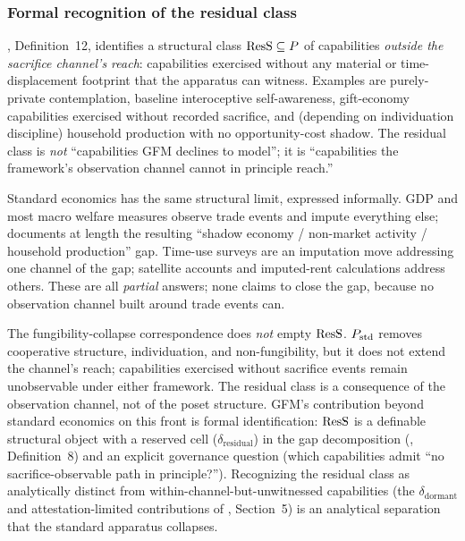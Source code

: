 \subsubsection{Formal recognition of the residual class}
\label{sec:fc_residual}

\citep[Need~Sufficiency]{lasser2026paper8b}, Definition~12,
identifies a structural class $\mathrm{ResS} \subseteq P$ of capabilities
\emph{outside the sacrifice channel's reach}: capabilities exercised
without any material or time-displacement footprint that the
\citep[Revealed~Sacrifice]{lasser2026paper8a} apparatus can witness.
Examples are purely-private contemplation, baseline interoceptive
self-awareness, gift-economy capabilities exercised without recorded
sacrifice, and (depending on individuation discipline) household
production with no opportunity-cost shadow.  The residual class is
\emph{not} ``capabilities GFM declines to model''; it is
``capabilities the framework's observation channel cannot in
principle reach.''

Standard economics has the same structural limit, expressed
informally.  GDP and most macro welfare measures observe trade
events and impute everything else;
\citep{stiglitz2009report} documents at length the resulting
``shadow economy / non-market activity / household production''
gap.  Time-use surveys \citep{aguiar2007measuring} are an
imputation move addressing one channel of the gap; satellite
accounts and imputed-rent calculations address others.  These are
all \emph{partial} answers; none claims to close the gap, because
no observation channel built around trade events can.

The fungibility-collapse correspondence does \emph{not} empty
$\mathrm{ResS}$.  $P_{\mathrm{std}}$ removes cooperative structure, individuation, and
non-fungibility, but it does not extend the channel's reach;
capabilities exercised without sacrifice events remain unobservable
under either framework.  The residual class is a consequence of the
observation channel, not of the poset structure.  GFM's
contribution beyond standard economics on this front is formal
identification: $\mathrm{ResS}$ is a definable structural object with a
reserved cell ($\delta_{\mathrm{residual}}$) in the gap
decomposition (\citep[Need~Sufficiency]{lasser2026paper8b},
Definition~8) and an explicit governance question (which
capabilities admit ``no sacrifice-observable path in principle?'').
Recognizing the residual class as analytically distinct from
within-channel-but-unwitnessed capabilities (the
$\delta_{\mathrm{dormant}}$ and attestation-limited contributions
of \citep[Need~Sufficiency]{lasser2026paper8b},
Section~5) is an analytical separation that the standard apparatus
collapses.

